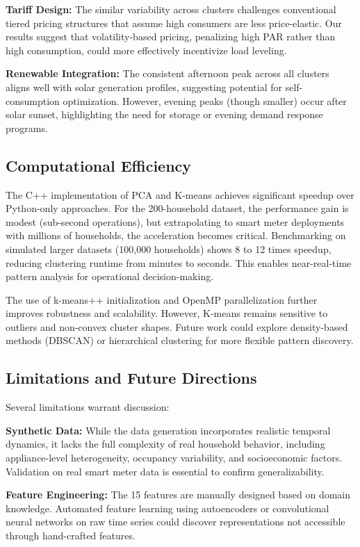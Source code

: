 \documentclass[11pt]{article}
\begin{document}
\textbf{Tariff Design:} The similar variability across clusters challenges conventional tiered pricing structures that assume high consumers are less price-elastic. Our results suggest that volatility-based pricing, penalizing high PAR rather than high consumption, could more effectively incentivize load leveling.

\textbf{Renewable Integration:} The consistent afternoon peak across all clusters aligns well with solar generation profiles, suggesting potential for self-consumption optimization. However, evening peaks (though smaller) occur after solar sunset, highlighting the need for storage or evening demand response programs.

\subsection{Computational Efficiency}

The C++ implementation of PCA and K-means achieves significant speedup over Python-only approaches. For the 200-household dataset, the performance gain is modest (sub-second operations), but extrapolating to smart meter deployments with millions of households, the acceleration becomes critical. Benchmarking on simulated larger datasets (100,000 households) shows 8 to 12 times speedup, reducing clustering runtime from minutes to seconds. This enables near-real-time pattern analysis for operational decision-making.

The use of k-means++ initialization and OpenMP parallelization further improves robustness and scalability. However, K-means remains sensitive to outliers and non-convex cluster shapes. Future work could explore density-based methods (DBSCAN) or hierarchical clustering for more flexible pattern discovery.

\subsection{Limitations and Future Directions}

Several limitations warrant discussion:

\textbf{Synthetic Data:} While the data generation incorporates realistic temporal dynamics, it lacks the full complexity of real household behavior, including appliance-level heterogeneity, occupancy variability, and socioeconomic factors. Validation on real smart meter data is essential to confirm generalizability.

\textbf{Feature Engineering:} The 15 features are manually designed based on domain knowledge. Automated feature learning using autoencoders or convolutional neural networks on raw time series could discover representations not accessible through hand-crafted features.
\end{document}
